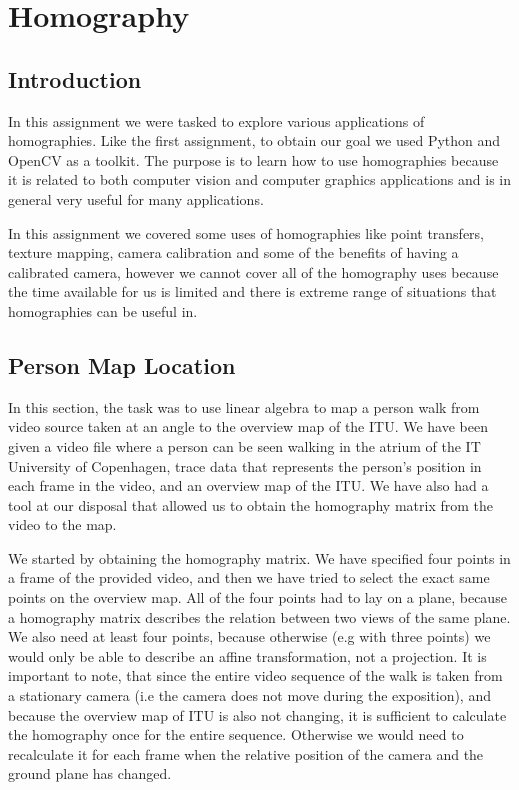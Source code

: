 \pagebreak
\section{Homography}

\subsection{Introduction}
In this assignment we were tasked to explore various applications of homographies. Like the first assignment, to obtain our goal we used Python and OpenCV as a toolkit. The purpose is to learn how to use homographies because it is related to both computer vision and computer graphics applications and is in general very useful for many applications. 

In this assignment we covered some uses of homographies like point transfers, texture mapping, camera calibration and some of the benefits of having a calibrated camera, however we cannot cover all of the homography uses because the time available for us is limited and there is extreme range of situations that homographies can be useful in.


\subsection{Person Map Location}

In this section, the task was to use linear algebra to map a person walk from video source taken at an angle to the overview map of the ITU. We have been given a video file where a person can be seen walking in the atrium of the IT University of Copenhagen, trace data that represents the person's position in each frame in the video, and an overview map of the ITU. We have also had a tool at our disposal that allowed us to obtain the homography matrix from the video to the map. 

We started by obtaining the homography matrix. We have specified four points in a frame of the provided video, and then we have tried to select the exact same points on the overview map. All of the four points had to lay on a plane, because a homography matrix describes the relation between two views of the same plane. We also need at least four points, because otherwise (e.g with three points) we would only be able to describe an affine transformation, not a projection. It is important to note, that since the entire video sequence of the walk is taken from a stationary camera (i.e the camera does not move during the exposition), and because the overview map of ITU is also not changing, it is sufficient to calculate the homography once for the entire sequence. Otherwise we would need to recalculate it for each frame when the relative position of the camera and the ground plane has changed.


